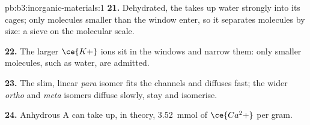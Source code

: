 \begin{solution}{pb:b3:inorganic-materials:1}
\textbf{21.} Dehydrated, the  takes up water strongly into its cages; only
molecules smaller than the window enter, so it separates molecules by size:
a sieve on the molecular scale.

\textbf{22.} The larger $\ce{K+}$ ions sit in the windows and narrow them: only smaller
molecules, such as water, are admitted.

\textbf{23.} The slim, linear \textit{para} isomer fits the channels and diffuses fast; the
wider \textit{ortho} and \textit{meta} isomers diffuse slowly, stay and isomerise.

\textbf{24.} Anhydrous  A can take up, in theory, \qty{3.52}{mmol} of $\ce{Ca^2+}$ per gram.
\end{solution}
